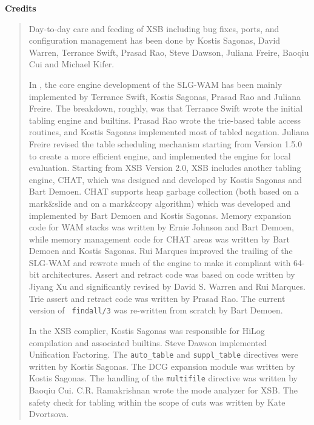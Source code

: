 \begin{center}
{\bf {\Large 
		Credits
}}
\end{center}


\begin{quote}
Day-to-day care and feeding of XSB including bug fixes, ports, and
configuration management has been done by Kostis Sagonas, David
Warren, Terrance Swift, Prasad Rao, Steve Dawson, Juliana Freire, 
Baoqiu Cui and Michael Kifer.

In \version, the core engine development of the SLG-WAM has been
mainly implemented by Terrance Swift, Kostis Sagonas, Prasad Rao and
Juliana Freire.  The breakdown, roughly, was that Terrance Swift wrote
the initial tabling engine and builtins.  Prasad Rao wrote the
trie-based table access routines, and Kostis Sagonas implemented most
of tabled negation.  Juliana Freire revised the table scheduling
mechanism starting from Version 1.5.0 to create a more efficient
engine, and implemented the engine for local evaluation.  Starting
from XSB Version 2.0, XSB includes another tabling engine, CHAT, which
was designed and developed by Kostis Sagonas and Bart Demoen.  CHAT
supports heap garbage collection (both based on a mark\&slide and on a
mark\&copy algorithm) which was developed and implemented by Bart
Demoen and Kostis Sagonas.  Memory expansion code for WAM stacks was
written by Ernie Johnson and Bart Demoen, while memory management code
for CHAT areas was written by Bart Demoen and Kostis Sagonas.  Rui
Marques improved the trailing of the SLG-WAM and rewrote much of the
engine to make it compliant with 64-bit architectures.  Assert and
retract code was based on code written by Jiyang Xu and significantly
revised by David S. Warren and Rui Marques.  Trie assert and retract
code was written by Prasad Rao.  The current version of {\tt
findall/3} was re-written from scratch by Bart Demoen.

In the XSB complier, Kostis Sagonas was responsible for HiLog
compilation and associated builtins.  Steve Dawson implemented
Unification Factoring.  The {\tt auto\_table} and {\tt suppl\_table}
directives were written by Kostis Sagonas.  The DCG expansion module
was written by Kostis Sagonas.  The handling of the {\tt multifile}
directive was written by Baoqiu Cui.  C.R. Ramakrishnan wrote the mode
analyzer for XSB.  The safety check for tabling within the scope of
cuts was written by Kate Dvortsova.


\end{quote}
